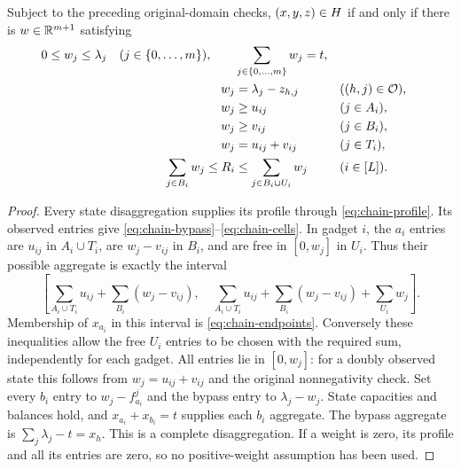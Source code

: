 \begin{proposition}\label{prop:chain-profile}
Subject to the preceding original-domain checks, $(x,y,z)\in H$
if and only if there is $w\in\mathbb R^{m+1}$ satisfying
\begin{align}
 0\le w_j\le\lambda_j\quad(j\in\{0,\ldots,m\}),\qquad
 &\sum_{j\in\{0,\ldots,m\}}w_j=t,\label{eq:chain-profile-bounds}\\
 w_j&=\lambda_j-z_{h,j}&&((h,j)\in\mathcal O),\label{eq:chain-bypass}\\
 w_j&\ge u_{ij}&&(j\in A_i),\nonumber\\
 w_j&\ge v_{ij}&&(j\in B_i),\nonumber\\
 w_j&=u_{ij}+v_{ij}&&(j\in T_i),\label{eq:chain-cells}\\
 \sum_{j\in B_i}w_j\le R_i&\le
       \sum_{j\in B_i\cup U_i}w_j&&(i\in[L]).\label{eq:chain-endpoints}
\end{align}
\end{proposition}
\begin{proof}
Every state disaggregation supplies its profile through
\eqref{eq:chain-profile}. Its observed entries give
\eqref{eq:chain-bypass}--\eqref{eq:chain-cells}. In gadget $i$,
the $a_i$ entries are $u_{ij}$ in $A_i\cup T_i$, are $w_j-v_{ij}$
in $B_i$, and are free in $[0,w_j]$ in $U_i$. Thus their possible
aggregate is exactly the interval
\[
 \left[\sum_{A_i\cup T_i}u_{ij}+\sum_{B_i}(w_j-v_{ij}),\quad
 \sum_{A_i\cup T_i}u_{ij}+\sum_{B_i}(w_j-v_{ij})+
 \sum_{U_i}w_j\right].
\]
Membership of $x_{a_i}$ in this interval is
\eqref{eq:chain-endpoints}.
Conversely these inequalities allow the free $U_i$ entries to be
chosen with the required sum, independently for each gadget. All
entries lie in $[0,w_j]$: for a doubly observed state this follows
from $w_j=u_{ij}+v_{ij}$ and the original nonnegativity check.
Set every $b_i$ entry to $w_j-f^j_{a_i}$ and the bypass entry to
$\lambda_j-w_j$. State capacities and balances hold, and
$x_{a_i}+x_{b_i}=t$ supplies each $b_i$ aggregate. The bypass
aggregate is $\sum_j\lambda_j-t=x_h$. This is a complete
disaggregation. If a weight is zero, its profile and all its entries
are zero, so no positive-weight assumption has been used.
\end{proof}

